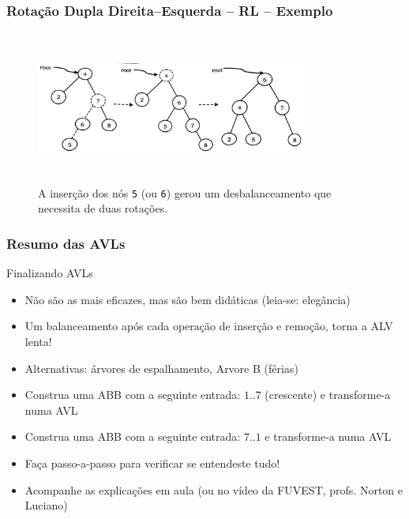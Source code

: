 
\begin{frame}
    \frametitle{Rotação Dupla Direita--Esquerda -- RL -- Exemplo}
      
   \begin{figure}[!ht]
     \centering
    \includegraphics[width=9cm, height=5cm]{figs/fig_arvores/avl07RL-example.jpg}
    \caption{A inserção dos nós \texttt{5} (ou \texttt{6}) gerou 
    um desbalanceamento que necessita de duas rotações.}
    \end{figure}
\end{frame}



\begin{frame}
    \frametitle{Resumo das AVLs}
   
  \begin{block}{Finalizando AVLs}
  
     \begin{itemize}
        \item Não são as mais eficazes, mas são bem didáticas (leia-se: elegância)
        
        \pause
        \item Um balanceamento após cada operação de inserção e remoção, torna a ALV lenta!

        \pause
        \item Alternativas: árvores de espalhamento, Arvore B (férias)

        \pause
        \item Construa uma ABB com a seguinte entrada: $1 .. 7$ (crescente) e transforme-a numa AVL

        \item Construa uma ABB com a seguinte entrada: $7 .. 1$ e transforme-a numa AVL
        
        \item Faça passo-a-passo para verificar se entendeste tudo!
        
        \item Acompanhe as explicações em aula (ou no vídeo da FUVEST, profs. Norton e Luciano)
        
      \end{itemize}
      \end{block}

\end{frame}

